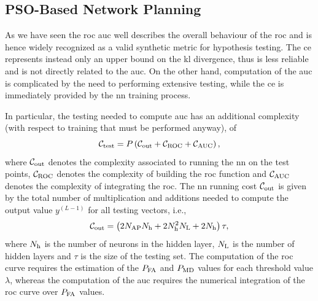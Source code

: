 \documentclass[conference]{IEEEtran}
\begin{document}
\subsection{PSO-Based Network Planning}

As we have seen the \ac{roc} \ac{auc} well describes the overall behaviour of the \ac{roc} and is hence widely recognized as a valid synthetic metric for hypothesis testing. The \ac{ce} represents instead only an upper bound on the \ac{kl} divergence, thus is less reliable and is not directly related to the \ac{auc}. On the other hand, computation of the \ac{auc} is complicated by the need to performing extensive testing, while the \ac{ce} is immediately provided by the \ac{nn} training process. 

In particular, the testing needed to compute \ac{auc} has an additional complexity (with respect to training that must be performed anyway), of 
\begin{equation}
    \mathcal{C}_{\rm test} = P \left( \mathcal{C}_{\rm out}+\mathcal{C}_{\rm ROC}+\mathcal{C}_{\rm AUC}\right),
\end{equation}
where  $\mathcal{C}_{\rm out}$ denotes the complexity associated to running the \ac{nn} on the test points, $\mathcal{C}_{\rm ROC}$ denotes the complexity of building the \ac{roc} function and $\mathcal{C}_{\rm AUC}$ denotes the complexity of integrating the \ac{roc}. The \ac{nn} running cost $\mathcal{C}_{\rm out}$ is given by the total number of multiplication and additions needed to compute the output value $y^{(L-1)}$ for all testing vectors, i.e.,
\begin{equation}
    \mathcal{C}_{\rm out} = \left(2N_{\rm AP}N_{\rm h}+2N_{\rm h}^2N_{\rm L} + 2N_{\rm h}\right)\tau ,
\end{equation}
where $N_{\rm h}$ is the number of neurons in the hidden layer, $N_{\rm L}$ is the number of hidden layers and $\tau$ is the size of the testing set.
The computation of the \ac{roc} curve requires the estimation of the $P_{\rm FA}$ and $P_{\rm MD}$ values for each threshold value $\lambda$, whereas the computation of the \ac{auc} requires the numerical integration of the \ac{roc} curve over $P_{\rm FA}$ values.
\end{document}
